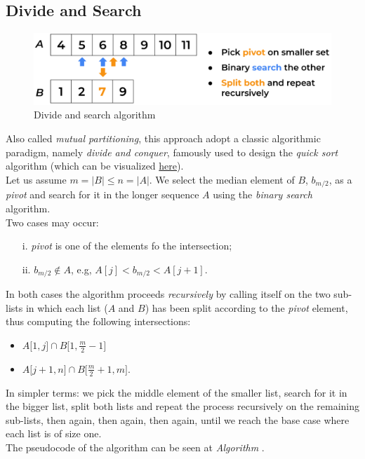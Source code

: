 \subsection{Divide and Search}

\begin{figure}[H] 
    \begin{center}
        \includegraphics[width=.8\textwidth]{imgs/divide_and_search.png}
        \caption{Divide and search algorithm \label{fig:divandsearch}}
    \end{center}
\end{figure}

Also called \textit{mutual partitioning}, this approach adopt a classic algorithmic paradigm, namely \textit{divide and conquer}, famously used to design the \textit{quick sort} algorithm (which can be visualized \href{https://en.wikipedia.org/wiki/Quicksort}{here}).\\
Let us assume $m=|B| \leq n=|A|$. We select the median element of $B$, $b_{m/2}$, as a \textit{pivot} and search for it in the longer sequence $A$ using the \textit{binary search}  algorithm.\\
Two cases may occur: 

\begin{itemize}
    \item[i.] \textit{pivot} is one of the elements fo the intersection;
    \item[ii.] $b_{m/2} \notin A$, e.g, $A[j]<b_{m/2}<A[j+1]$.
\end{itemize}

In both cases the algorithm proceeds \textit{recursively} by calling itself on the two sub-lists in which each list ($A$ and $B$) has been split according to the \textit{pivot} element, thus computing the following intersections:

\begin{itemize}
    \item $A\big[1, j\big] \cap B\big[1, \frac{m}{2}-1\big]$
    \item $A\big[ j+1, n\big] \cap B\big[\frac{m}{2}+1, m\big]$.
\end{itemize}

In simpler terms: we pick the middle element of the smaller list, search for it in the bigger list, split both lists and repeat the process recursively on the remaining sub-lists, then again, then again, then again, until we reach the base case where each list is of size one.\\
The pseudocode of the algorithm can be seen at \textit{Algorithm} .

